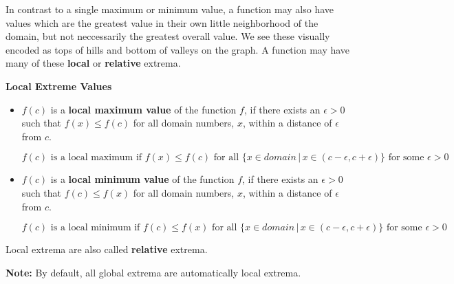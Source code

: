 \documentclass{ximera}
\begin{document}
In contrast to a single maximum or minimum value, a function may also have values which are the greatest value in their own little neighborhood of the domain, but not neccessarily the greatest overall value.  We see these visually encoded as tops of hills and bottom of valleys on the graph.  A function may have many of these \textbf{local} or \textbf{relative} extrema.






\begin{definition} \textbf{\textcolor{green!50!black}{Local Extreme Values}} 
\begin{itemize}
\item $f(c)$ is a \textbf{local maximum value} of the function $f$, if there exists an $\epsilon > 0$ such that $f(x) \leq f(c)$ for all domain numbers, $x$, within a distance of $\epsilon$ from $c$. 

\[  f(c) \text{ is a local maximum if } f(x) \leq f(c) \text{ for all } \{ x \in domain \, | \, x \in (c - \epsilon, c + \epsilon) \} \text{ for some } \epsilon > 0 \]







\item $f(c)$ is a \textbf{local minimum value} of the function $f$, if there exists an $\epsilon > 0$ such that $f(c) \leq f(x)$ for all domain numbers, $x$, within a distance of $\epsilon$ from $c$. 



\[  f(c) \text{ is a local minimum if } f(c) \leq f(x) \text{ for all } \{ x \in domain \, | \, x \in (c - \epsilon, c + \epsilon) \} \text{ for some } \epsilon > 0 \]
\end{itemize}

Local extrema are also called \textbf{relative} extrema.

\end{definition}





\textbf{Note:} By default, all global extrema are automatically local extrema.
\end{document}
